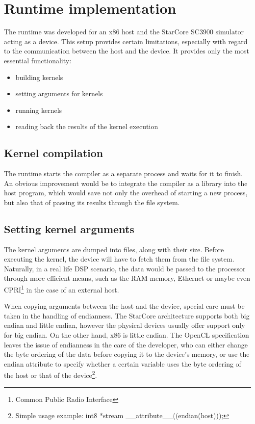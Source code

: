 \chapter{Runtime implementation}
\label{chapter:runtime}

The runtime was developed for an x86 host and the StarCore SC3900 simulator acting as a device. This setup provides certain limitations, especially with regard to the communication between the host and the device. It provides only the most essential functionality:
\begin{itemize}
\item building kernels
\item setting arguments for kernels
\item running kernels
\item reading back the results of the kernel execution
\end{itemize}

\section{Kernel compilation}
The runtime starts the compiler as a separate process and waits for it to finish. An obvious improvement would be to integrate the compiler as a library into the host program, which would save not only the overhead of starting a new process, but also that of passing its results through the file system.

\section{Setting kernel arguments}
The kernel arguments are dumped into files, along with their size. Before executing the kernel, the device will have to fetch them from the file system. Naturally, in a real life DSP scenario, the data would be passed to the processor through more efficient means, such as the RAM memory, Ethernet or maybe even CPRI\footnote{Common Public Radio Interface} in the case of an external host. 

When copying arguments between the host and the device, special care must be taken in the handling of endianness. The StarCore architecture supports both big endian and little endian, however the physical devices usually offer support only for big endian. On the other hand, x86 is little endian. The OpenCL specification leaves the issue of endianness in the care of the developer, who can either change the byte ordering of the data before copying it to the device's memory, or use the endian attribute to specify whether a certain variable uses the byte ordering of the host or that of the device\footnote{Simple usage example: int8 *stream \_\_attribute\_\_((endian(host)));}.

